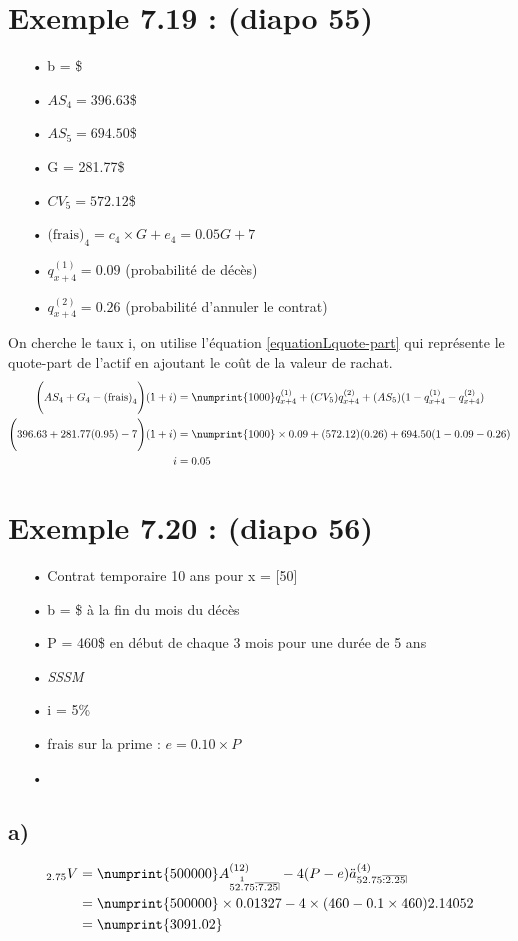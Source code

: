 \documentclass[11pt,french]{report}
\makeatletter
\DeclareRobustCommand{\annuity}[1]{%
\def\arraystretch{0}%
\setlength\arraycolsep{.7pt}%
\setlength\arrayrulewidth{.3pt}%
\begin{array}[b]{@{}c|}\hline
\\[\arraycolsep]%
\scriptstyle #1%
\end{array}%
}
\newcommand{\indiceGauche}[2]{{\vphantom{#2}}_{#1}#2}
\makeatother
\begin{document}
\section{Exemple 7.19 : (diapo 55)}
\begin{itemize}
\item[•] b = \$
\item[•] $AS_4 = 396.63$\$
\item[•] $AS_5 = 694.50$\$
\item[•] G = 281.77\$
\item[•] $CV_5 = 572.12$\$
\item[•] $\text{(frais)}_{4} = c_4 \times G + e_4 = 0.05G + 7 $
\item[•] $q_{x+4}^{(1)} = 0.09$ (probabilité de décès)
\item[•] $q_{x+4}^{(2)} = 0.26$ (probabilité d'annuler le contrat)
\end{itemize}
On cherche le taux i, on utilise l'équation \ref{equationLquote-part} qui représente le quote-part de l'actif en ajoutant le coût de la valeur de rachat.
\begin{align*}
\Bigg( AS_4 + G_4 - \text{(frais)}_{4}\Bigg)(1+i) &= \numprint{1000} q_{x+4}^{(1)} + (CV_5)q_{x+4}^{(2)} + (AS_5)(1 - q_{x+4}^{(1)} - q_{x+4}^{(2)}) \\
\Bigg( 396.63 + 281.77(0.95) - 7 \Bigg)(1+i) &= \numprint{1000} \times 0.09 + (572.12)(0.26) + 694.50( 1 - 0.09 -0.26) \\
i &= 0.05
\end{align*}

\section{Exemple 7.20 : (diapo 56)}
\label{sec:exemple7.20}
\begin{itemize}
\item[•] Contrat temporaire 10 ans pour x = [50]
\item[•] b = \$ à la fin du mois du décès
\item[•] P = 460\$ en début de chaque 3 mois pour une durée de 5 ans
\item[•] \emph{SSSM}
\item[•] i = 5\%
\item[•] frais sur la prime : $e = 0.10 \times P$
\item[•] 
\end{itemize}

\subsection*{a)}
\begin{align*}
\indiceGauche{2.75}{V} &= \numprint{500000} A_{\overset{1}{52.75} \annuity{:7.25}}^{(12)} - 4(P-e)\ddot{a}_{52.75 \annuity{:2.25}}^{(4)}\\
&= \numprint{500000} \times 0.01327- 4 \times (460-0.1 \times 460) 2.14052 \\
&= \numprint{3091.02}
\end{align*}
\end{document}
